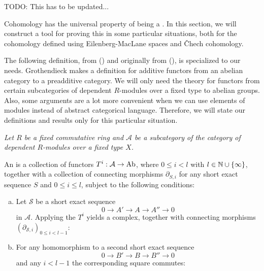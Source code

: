 TODO: This has to be updated...

Cohomology has the universal property of being a .
In this section, we will construct a tool for proving this in some particular situations,
both for the cohomology defined using Eilenberg-MacLane spaces and \v{C}hech cohomology.

The following definition, from (\cite[2.1]{tohoku-translation}) and originally from (\cite{tohoku1957}), is specialized to our needs.
Grothendieck makes a definition for additive functors from an abelian category to a preadditive category.
We will only need the theory for functors from certain subcategories of dependent $R$-modules over a fixed type to abelian groups.
Also, some arguments are a lot more convenient when we can use elements of modules instead of abstract categorical language.
Therefore, we will state our definitions and results only for this particular situation.

\emph{Let $R$ be a fixed commutative ring and $\mathcal A$ be a subcategory of the category of dependent $R$-modules over a fixed type $X$.}

\begin{definition}
  An  is a collection of functors $T^i:\mathcal A\to \operatorname{Ab}$, where $0\leq i < l$ with $l\in\mathbb{N}\cup\{\infty\}$,
  together with a collection of connecting morphisms $\partial_{S,i}$ for any short exact sequence $S$ and $0\leq i\le l$, subject to the following conditions:
  \begin{enumerate}[(a)]
  \item Let $\mathcal{S}$ be a short exact sequence
    \[ 0\to A'\to A\to A''\to 0\]
    in $\mathcal A$. Applying the $T^i$ yields a complex, together with connecting morphisms $(\partial_{\mathcal{S},i})_{0\leq i<l-1}$:
    \begin{center}
    \end{center}
  \item For any homomorphism to a second short exact sequence
    \[ 0\to B'\to B\to B''\to 0\]
    and any $i<l-1$ the corresponding square commutes:
    \begin{center}
    \end{center}
  \end{enumerate}
\end{definition}

